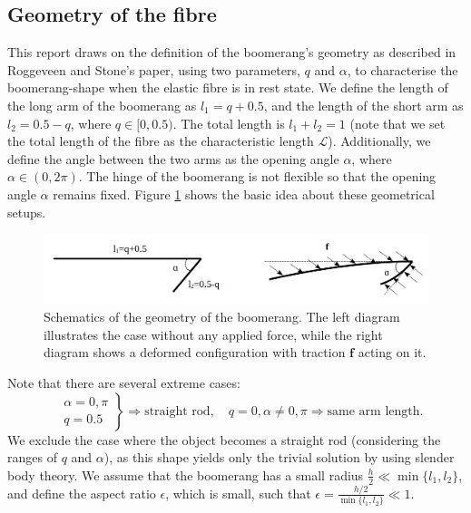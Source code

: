 \documentclass[lineno]{JFM-FLM_Au}
\begin{document}
\subsection{Geometry of the fibre}
This report draws on the definition of the boomerang's geometry as described in Roggeveen and Stone's paper, using two parameters, $q$ and $\alpha$, to characterise the boomerang-shape when the elastic fibre is in rest state. We define the length of the long arm of the boomerang as $l_1=q+0.5$, and the length of the short arm as $l_2=0.5-q$, where $q \in [0,0.5)$. The total length is $l_1+l_2=1$ (note that we set the total length of the fibre as the characteristic length $\mathcal{L}$). Additionally, we define the angle between the two arms as the opening angle $\alpha$, where $\alpha \in (0,2\pi)$. The hinge of the boomerang is not flexible so that the opening angle $\alpha$ remains fixed. Figure \ref{fig:1} shows the basic idea about these geometrical setups. 
\begin{figure}[htb]
	\begin{center}
		\includegraphics[width=1\textwidth]{plot/geometry.png}
		\caption{Schematics of the geometry of the boomerang. The left diagram illustrates the case without any applied force, while the right diagram shows a deformed configuration with traction $\mathbf{f}$ acting on it.}
		\label{fig:1}
	\end{center}
\end{figure}
Note that there are several extreme cases:
\begin{equation}
	\label{eqn:1}
	\left.
	\begin{aligned}
		&\alpha=0,\pi \\
		&	q=0.5
	\end{aligned}
	\right\}\Longrightarrow \text{straight rod},\quad 
	q=0, \alpha \neq 0, \pi \Longrightarrow \text{same arm length}.
\end{equation}
We exclude the case where the object becomes a straight rod (considering the ranges of $q$ and $\alpha$), as this shape yields only the trivial solution by using slender body theory. We assume that the boomerang has a small radius $\frac{h}{2}\ll \min\{l_1, l_2\}$, and define the aspect ratio $\epsilon$, which is small, such that $\epsilon=\frac{h/2}{\min\{l_1, l_2\}}\ll1$. 
\end{document}
